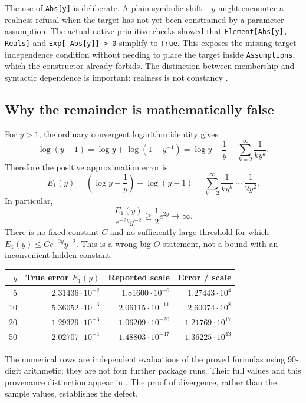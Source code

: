 \documentclass[11pt,letterpaper]{article}
\newcommand{\code}[1]{\texttt{#1}}
\newcommand{\source}[1]{\path{#1}}
\begin{document}
The use of \code{Abs[y]} is deliberate. A plain symbolic shift $-y$ might encounter a realness refusal when the target has not yet been constrained by a parameter assumption. The actual native primitive checks showed that \code{Element[Abs[y], Reals]} and \code{Exp[-Abs[y]] > 0} simplify to \code{True}. This exposes the missing target-independence condition without needing to place the target inside \code{Assumptions}, which the constructor already forbids. The distinction between membership and syntactic dependence is important: realness is not constancy \cite{element,freeq}.

\subsection{Why the remainder is mathematically false}
For $y>1$, the ordinary convergent logarithm identity gives
\[
 \log(y-1)=\log y+\log(1-y^{-1})
 =\log y-\frac1y-\sum_{k=2}^{\infty}\frac{1}{k y^k}.
\]
Therefore the positive approximation error is
\begin{equation}\label{eq:error}
 E_1(y)=\left(\log y-\frac1y\right)-\log(y-1)
 =\sum_{k=2}^{\infty}\frac{1}{k y^k}
 \sim\frac{1}{2y^2}.
\end{equation}
In particular,
\[
 \frac{E_1(y)}{e^{-2y}y^{-2}}
 \geq \frac12 e^{2y}\longrightarrow\infty.
\]
There is no fixed constant $C$ and no sufficiently large threshold for which $E_1(y)\leq C e^{-2y}y^{-2}$. This is a wrong big-$O$ statement, not a bound with an inconvenient hidden constant.

\begin{center}
\begin{tabular}{@{}rrrr@{}}
\toprule
$y$ & True error $E_1(y)$ & Reported scale & Error / scale\\
\midrule
5  & $2.31436\cdot10^{-2}$ & $1.81600\cdot10^{-6}$ & $1.27443\cdot10^4$\\
10 & $5.36052\cdot10^{-3}$ & $2.06115\cdot10^{-11}$ & $2.60074\cdot10^8$\\
20 & $1.29329\cdot10^{-3}$ & $1.06209\cdot10^{-20}$ & $1.21769\cdot10^{17}$\\
50 & $2.02707\cdot10^{-4}$ & $1.48803\cdot10^{-47}$ & $1.36225\cdot10^{43}$\\
\bottomrule
\end{tabular}
\end{center}
The numerical rows are independent evaluations of the proved formulas using 90-digit arithmetic; they are not four further package runs. Their full values and this provenance distinction appear in \source{evidence/numerical_samples.csv}. The proof of divergence, rather than the sample values, establishes the defect.
\end{document}
